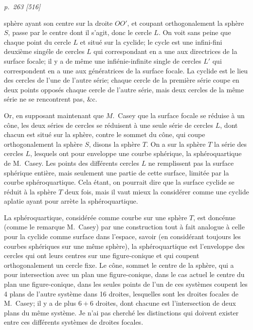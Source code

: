 \documentclass[11pt,a4paper]{book}
\begin{document}
\clearpage

\bigskip
\textit{p.~263 [516]}
\smallskip

\noindent
sph\`ere ayant son centre sur la droite $OO'$, et coupant orthogonalement la sph\`ere $S$,
passe par le centre dont il s'agit, donc le cercle $L$.  On voit sans peine que chaque
point du cercle $L$ et situ\'e sur la cyclide; le cycle est une infini-fini deuxi\`eme
sing\'ele de cercles $L$ qui correspondant en a une aux directrices de la surface focale; il
y a de m\^eme une infi\'enie-infinite single de cercles $L'$ qui correspondent en a une aux
g\'en\'eratrices de la surface focale.  La cyclide est le lieu des cercles de l'une de l'autre
s\'erie; chaque cercle de la premi\`ere s\'erie coupe en deux points oppos\'es chaque cercle
de l'autre s\'erie, mais deux cercles de la m\^eme s\'erie ne se rencontrent pas, \&c.

Or, en supposant maintenant que $M$.~Casey que la surface focale se r\'eduise \`a un c\^one, les
deux s\'eries de cercles se r\'eduisent \`a une seule s\'erie de cercles $L$, dont chacun est
situ\'e sur la sph\`ere, contre le sommet du c\^one, qui coupe orthogonalement la sph\`ere
$S$, disons la sph\`ere $T$.  On a sur la sph\`ere $T$ la s\'erie des cercles $L$, lesquels ont pour
enveloppe une courbe sph\'erique, la sph\'eroquartique de M.~Casey.  Les points des
diff\'erents cercles $L$ ne remplissent pas la surface sph\'erique enti\`ere, mais seulement une
partie de cette surface, limit\'ee par la courbe sph\'eroquartique.  Cela \'etant, on pourrait
dire que la surface cyclide se r\'eduit \`a la sph\`ere $T$ deux fois, mais il vaut mieux
la consid\'erer comme une cyclide aplatie ayant pour arr\`ete la sph\'eroquartique.

La sph\'eroquartique, consid\'er\'ee comme courbe sur une sph\`ere $T$, est donc\'enue (comme
le remarque M.~Casey) par une construction tout \`a fait analogue \`a celle pour la cyclide
comme surface dans l'espace, savoir (en consid\'erant toujours les courbes sph\'eriques sur
une m\^eme sph\`ere), la sph\'eroquartique est l'enveloppe des cercles qui ont leurs centres
sur une figure-conique et qui coupent orthogonalement un cercle fixe.  Le c\^one, sommet
le centre de la sph\`ere, qui a pour intersection avec un plan une figure-conique, dans
le cas actuel le centre du plan une figure-conique, dans
les seules points de l'un de ces syst\`emes coupent les 4 plans de l'autre syst\`eme dans
16 droites, lesquelles sont les droites focales de M.~Casey; il y a de plus $6 + 6$
droites, dont chacune est l'intersection de deux plans du m\^eme syst\`eme.  Je n'ai pas
cherch\'e les distinctions qui doivent exister entre ces diff\'erents syst\`emes de droites
focales.
\end{document}
